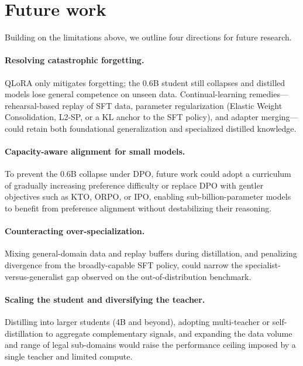 \section{Future work}

Building on the limitations above, we outline four directions for future research.

\paragraph{Resolving catastrophic forgetting.}
QLoRA only mitigates forgetting; the 0.6B student still collapses and distilled models lose general competence on unseen data. Continual-learning remedies---rehearsal-based replay of SFT data, parameter regularization (Elastic Weight Consolidation, L2-SP, or a KL anchor to the SFT policy), and adapter merging---could retain both foundational generalization and specialized distilled knowledge.

\paragraph{Capacity-aware alignment for small models.}
To prevent the 0.6B collapse under DPO, future work could adopt a curriculum of gradually increasing preference difficulty or replace DPO with gentler objectives such as KTO, ORPO, or IPO, enabling sub-billion-parameter models to benefit from preference alignment without destabilizing their reasoning.

\paragraph{Counteracting over-specialization.}
Mixing general-domain data and replay buffers during distillation, and penalizing divergence from the broadly-capable SFT policy, could narrow the specialist-versus-generalist gap observed on the out-of-distribution benchmark.

\paragraph{Scaling the student and diversifying the teacher.}
Distilling into larger students (4B and beyond), adopting multi-teacher or self-distillation to aggregate complementary signals, and expanding the data volume and range of legal sub-domains would raise the performance ceiling imposed by a single teacher and limited compute.
